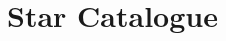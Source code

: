 \documentclass[../../main.tex]{subfiles}
\begin{document}
\section{Star Catalogue}
\thispagestyle{fancy}

\blindtext %
\end{document}
